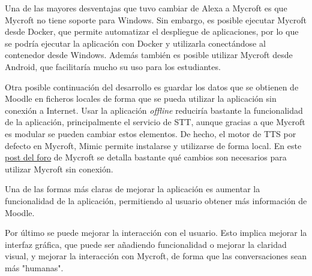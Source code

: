 Una de las mayores desventajas que tuvo cambiar de Alexa a Mycroft es que Mycroft no tiene soporte para Windows. Sin embargo, es posible ejecutar Mycroft desde Docker\cite{DockerSoftware2020}, que permite automatizar el despliegue de aplicaciones, por lo que se podría ejecutar la aplicación con Docker y utilizarla conectándose al contenedor desde Windows. Además también es posible utilizar Mycroft desde Android, que facilitaría mucho su uso para los estudiantes.

Otra posible continuación del desarrollo es guardar los datos que se obtienen de Moodle en ficheros locales de forma que se pueda utilizar la aplicación sin conexión a Internet. Usar la aplicación \textit{offline} reduciría bastante la funcionalidad de la aplicación, principalmente el servicio de STT, aunque gracias a que Mycroft es modular se pueden cambiar estos elementos. De hecho, el motor de TTS por defecto en Mycroft, Mimic\cite{Mimic} permite instalarse y utilizarse de forma local. En este \href{https://community.mycroft.ai/t/can-i-use-mycroft-offline/5306/5}{post del foro} de Mycroft se detalla bastante qué cambios son necesarios para utilizar Mycroft sin conexión.

Una de las formas más claras de mejorar la aplicación es aumentar la funcionalidad de la aplicación, permitiendo al usuario obtener más información de Moodle.

Por último se puede mejorar la interacción con el usuario. Esto implica mejorar la interfaz gráfica, que puede ser añadiendo funcionalidad o mejorar la claridad visual, y mejorar la interacción con Mycroft, de forma que las conversaciones sean más "humanas".
